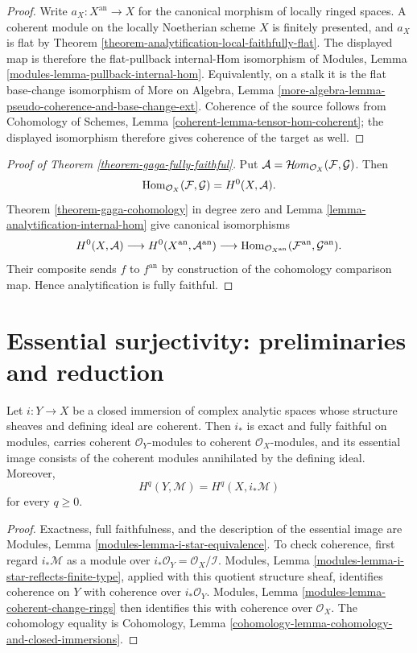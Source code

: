 \begin{proof}
Write $a_X:X^{\mathrm{an}}\to X$ for the canonical morphism of locally
ringed spaces. A coherent module on the locally Noetherian scheme $X$ is
finitely presented, and $a_X$ is flat by Theorem
\ref{theorem-analytification-local-faithfully-flat}. The displayed map is
therefore the flat-pullback internal-Hom isomorphism of Modules, Lemma
\ref{modules-lemma-pullback-internal-hom}. Equivalently, on a stalk it is
the flat base-change isomorphism of More on Algebra, Lemma
\ref{more-algebra-lemma-pseudo-coherence-and-base-change-ext}. Coherence of
the source follows from Cohomology of Schemes, Lemma
\ref{coherent-lemma-tensor-hom-coherent}; the displayed isomorphism therefore
gives coherence of the target as well.
\end{proof}

\begin{proof}[Proof of Theorem \ref{theorem-gaga-fully-faithful}]
Put $\mathcal A=\mathop{\mathcal{H}\!\mathit{om}}\nolimits_{\mathcal O_X}(\mathcal F,\mathcal G)$. Then
$$
\mathop{\mathrm{Hom}}\nolimits_{\mathcal O_X}(\mathcal F,\mathcal G)
=H^0(X,\mathcal A).
$$
Theorem \ref{theorem-gaga-cohomology} in degree zero and Lemma
\ref{lemma-analytification-internal-hom} give canonical isomorphisms
$$
H^0(X,\mathcal A)
\longrightarrow H^0(X^{\mathrm{an}},\mathcal A^{\mathrm{an}})
\longrightarrow
\mathop{\mathrm{Hom}}\nolimits_{\mathcal O_{X^{\mathrm{an}}}}
(\mathcal F^{\mathrm{an}},\mathcal G^{\mathrm{an}}).
$$
Their composite sends $f$ to $f^{\mathrm{an}}$ by construction of the
cohomology comparison map. Hence analytification is fully faithful.
\end{proof}

\section{Essential surjectivity: preliminaries and reduction}
\label{section-gaga-essential-surjectivity-preliminaries}

\begin{lemma}
\label{lemma-coherent-analytic-closed-immersion}
Let $i:Y\to X$ be a closed immersion of complex analytic spaces whose
structure sheaves and defining ideal are coherent. Then $i_*$ is exact and
fully faithful on modules, carries coherent $\mathcal O_Y$-modules to
coherent $\mathcal O_X$-modules, and its essential image consists of the
coherent modules annihilated by the defining ideal. Moreover,
$$
H^q(Y,\mathcal M)=H^q(X,i_*\mathcal M)
$$
for every $q\geq0$.
\end{lemma}

\begin{proof}
Exactness, full faithfulness, and the description of the essential image are
Modules, Lemma \ref{modules-lemma-i-star-equivalence}. To check coherence,
first regard $i_*\mathcal M$ as a module over
$i_*\mathcal O_Y=\mathcal O_X/\mathcal I$. Modules, Lemma
\ref{modules-lemma-i-star-reflects-finite-type}, applied with this quotient
structure sheaf, identifies coherence on $Y$ with coherence over
$i_*\mathcal O_Y$. Modules, Lemma
\ref{modules-lemma-coherent-change-rings} then identifies this with
coherence over $\mathcal O_X$. The cohomology equality is Cohomology, Lemma
\ref{cohomology-lemma-cohomology-and-closed-immersions}.
\end{proof}

